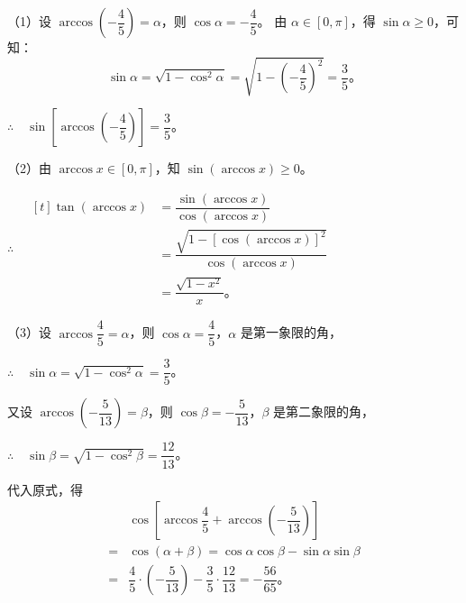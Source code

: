 \jie （1）设 $\arccos\left( -\dfrac{4}{5} \right) = \alpha$，则 $\cos\alpha = -\dfrac{4}{5}$。
由 $\alpha \in [0, \pi]$，得 $\sin\alpha \geqslant 0$，可知：
$$\sin\alpha = \sqrt{1 - \cos^2\alpha} = \sqrt{1 - \left( -\dfrac{4}{5} \right)^2} = \dfrac{3}{5} \text{。}$$

$\therefore \quad \sin\left[ \arccos\left( -\dfrac{4}{5} \right)\right] = \dfrac{3}{5}$。\jiange

（2）由 $\arccos x \in [0, \pi]$，知 $\sin(\arccos x) \geqslant 0$。

$\therefore \quad
\begin{aligned}[t]
    \tan(\arccos x) &= \dfrac{\sin(\arccos x)}{\cos(\arccos x)} \\
        & = \dfrac{\sqrt{1 - [\cos(\arccos x)]^2}}{\cos(\arccos x)} \\
        & = \dfrac{\sqrt{1 - x^2}}{x} \text{。}
\end{aligned}$ \jiange

（3）设 $\arccos \dfrac{4}{5} = \alpha$，则 $\cos\alpha = \dfrac{4}{5}$，$\alpha$ 是第一象限的角，\jiange

$\therefore \quad \sin\alpha = \sqrt{1 - \cos^2\alpha} = \dfrac{3}{5}$。\jiange

又设 $\arccos\left( -\dfrac{5}{13} \right) = \beta$，则 $\cos\beta = -\dfrac{5}{13}$，$\beta$ 是第二象限的角，\jiange

$\therefore \quad \sin\beta = \sqrt{1 - \cos^2\beta} = \dfrac{12}{13}$。\jiange

代入原式，得
\begin{align*}
    & \cos\left[ \arccos\dfrac{4}{5} + \arccos\left( -\dfrac{5}{13} \right)\right] \\
    = & \cos(\alpha + \beta) = \cos\alpha \cos\beta - \sin\alpha \sin\beta \\
    = & \dfrac{4}{5} \cdot \left( -\dfrac{5}{13} \right) - \dfrac{3}{5} \cdot \dfrac{12}{13} = -\dfrac{56}{65} \text{。}
\end{align*}

